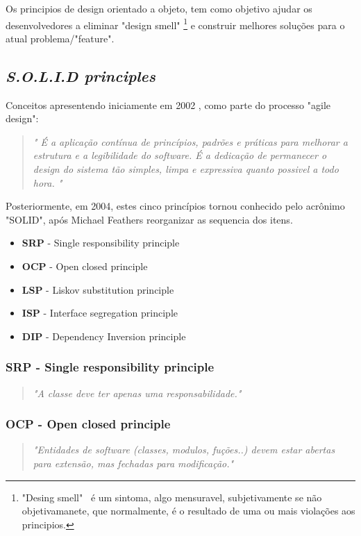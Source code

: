 \documentclass[12pt]{article}
\begin{document}
 Os principios de design orientado a objeto, tem como objetivo ajudar os desenvolvedores a eliminar "design smell" \footnote{"Desing smell"\ \cite{ROBERT_MARTIN_AGILE_SW_DEV_PPP} é um sintoma, algo mensuravel, subjetivamente se não objetivamanete, que normalmente, é o resultado de uma ou mais violações aos principios.} e construir melhores soluções para o atual problema/"feature".

\subsection{\textit{S.O.L.I.D principles}} \label{sec:solid}

 Conceitos apresentendo iniciamente em 2002 \cite{ROBERT_MARTIN_AGILE_SW_DEV_PPP}, como parte do processo "agile design":
 
 \begin{quote}
\textit{" É a aplicação contínua de princípios, padrões e práticas para melhorar a estrutura e a legibilidade do software. É a dedicação de permanecer o design do sistema tão simples, limpa e expressiva quanto possivel a todo hora. "}
 \end{quote}

 Posteriormente, em 2004, estes cinco princípios tornou conhecido pelo acrônimo "SOLID", após Michael Feathers reorganizar as sequencia dos itens. 

\begin{itemize}
	\item \textbf{SRP} - Single responsibility principle
	\item \textbf{OCP} - Open closed principle
	\item \textbf{LSP} - Liskov substitution principle
	\item \textbf{ISP} - Interface segregation principle
	\item \textbf{DIP} - Dependency Inversion principle
\end{itemize}

\subsubsection{SRP - Single responsibility principle}
\begin{quote}
	\textit{"A classe deve ter apenas uma responsabilidade."}	
\end{quote}
\subsubsection{OCP - Open closed principle}
\begin{quote}
	\textit{"Entidades de software (classes, modulos, fuções..) devem estar abertas para extensão, mas fechadas para modificação."}	
\end{quote}
\end{document}
